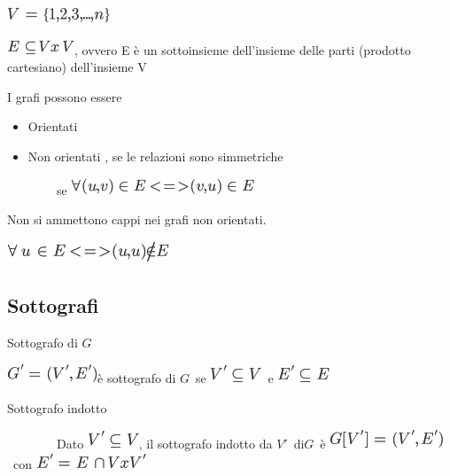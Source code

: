 \documentclass{article}
\providecommand{\tightlist}{%
  \setlength{\itemsep}{0pt}\setlength{\parskip}{0pt}}
\begin{document}
\includegraphics{images/image336.png}

\includegraphics{images/image337.png}{, ovvero E è un sottoinsieme
dell'insieme delle parti (prodotto cartesiano) dell'insieme V}

{}

{I grafi possono essere}

\begin{itemize}
\tightlist
\item
  {Orientati}
\item
  {Non orientati , se le relazioni sono simmetriche}
\end{itemize}

{~~~~~~~~se }\includegraphics{images/image338.png}



{Non si ammettono cappi nei grafi non orientati.}

\includegraphics{images/image339.png}

{}

\hypertarget{h.5gj1hs8i1ooy}{\subsection{\texorpdfstring{{Sottografi}}{Sottografi}}\label{h.5gj1hs8i1ooy}}

{Sottografo di }$G$

\includegraphics{images/image341.png}{è sottografo di
}$G${~se
}\includegraphics{images/image342.png}{~e
}\includegraphics{images/image343.png}

{}

{Sottografo indotto }

{~~~~~~~~Dato }\includegraphics{images/image342.png}{, il sottografo
indotto da
}$V'${~di}$G${~è
}\includegraphics{images/image345.png}{~con
}\includegraphics{images/image346.png}{~ }
\end{document}
